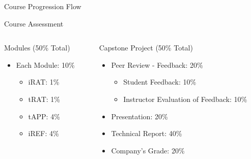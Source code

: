 \documentclass[
    NAME={Dr. Helga Ingimundardóttir},
    EMAIL={helgaingim@hi.is},
    FACULTY={Industrial Engineering},
    TITLE={Business Intelligence},
    SUBTITLE={Introduction},
    SEMINAR={IÐN610M},
    DATE={Spring, 2024}
]{HI-LaTeX/hi-beamer}
\begin{document}
\begin{frame}{Course Progression Flow}
\begin{figure}
        \end{figure}
    \end{frame}

    \begin{frame}{Course Assessment}
        \begin{columns}[T] %
            \begin{column}{.48\textwidth}
                \begin{block}{Modules (50\% Total)}
                    \begin{itemize}
                        \item Each Module: 10\%
                        \begin{itemize}
                            \item iRAT: 1\%
                            \item tRAT: 1\%
                            \item tAPP: 4\%
                            \item iREF: 4\%
                        \end{itemize}
                    \end{itemize}
                \end{block}
            \end{column}%
            \hfill%
            \begin{column}{.48\textwidth}
                \begin{block}{Capstone Project (50\% Total)}
                    \begin{itemize}
                        \item Peer Review - Feedback: 20\%
                        \begin{itemize}
                            \item Student Feedback: 10\%
                            \item Instructor Evaluation of Feedback: 10\%
                        \end{itemize}
                        \item Presentation: 20\%
                        \item Technical Report: 40\%
                        \item Company's Grade: 20\%
                    \end{itemize}
                \end{block}
            \end{column}%
        \end{columns}
    \end{frame}
\end{document}
